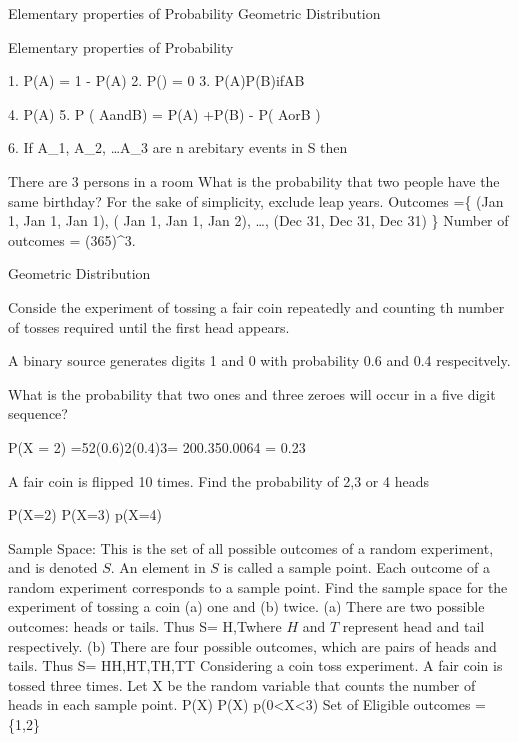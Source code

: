 Elementary properties of Probability
Geometric Distribution
 
Elementary properties of Probability
 
  1. P(A) = 1 - P(A)
2. P() = 0
3. P(A)P(B)ifAB
 
4. P(A) 
5.
P ( AandB) = P(A) +P(B) - P( AorB )
 
6. If A_1, A_2, \ldots A_3  are n arebitary events in S then
 
 
There are 3 persons in a room
What is the probability that two people have the same birthday?
For the sake of simplicity, exclude leap years.
Outcomes =\{ (Jan 1, Jan 1, Jan 1), ( Jan 1, Jan 1, Jan 2), \ldots , (Dec 31, Dec 31, Dec 31) \}
Number of outcomes = (365)^3.
 
Geometric Distribution
 
Conside the experiment of tossing a fair coin repeatedly and counting th number of tosses required until the first head appears.
 
 
A binary source generates digits 1 and 0 with probability  0.6 and 0.4 respecitvely.
 
What is the probability that two ones and three zeroes will occur in a five digit sequence?
 
 
P(X = 2) =52(0.6)2(0.4)3= 200.350.0064 = 0.23
 
 
A fair coin is flipped 10 times. Find the probability of 2,3 or 4 heads
 
P(X=2)
P(X=3)
p(X=4)
 

 

Sample Space: This is the set of all possible outcomes of a random experiment, and is denoted $S$. An element in $S$ is called a sample point.
Each outcome of a random experiment corresponds to a sample point.
Find the sample space for the experiment of tossing a coin (a) one and (b) twice.
(a) There are two possible outcomes: heads or tails.
Thus
S= {H,T}where $H$ and $T$ represent head and tail respectively.
(b) There are four possible outcomes, which are pairs of heads and tails.
Thus S= {HH,HT,TH,TT} 
Considering a coin toss experiment. A fair coin is tossed three times.
Let X be the random variable that counts the number of heads in each sample point.
P(X)
P(X)
p(0<X<3)
Set of Eligible outcomes = \{1,2\}

